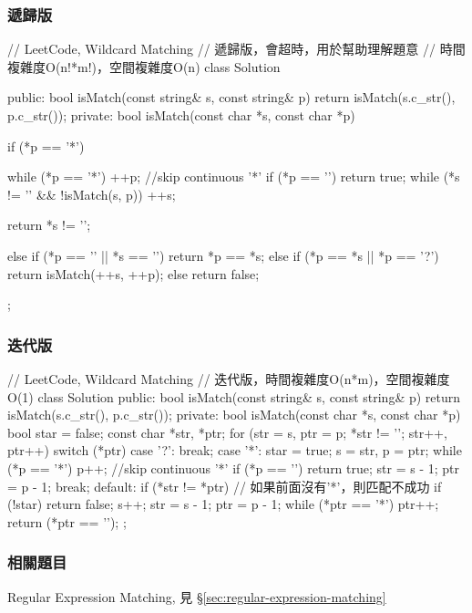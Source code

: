\subsubsection{遞歸版}
\begin{Code}
// LeetCode, Wildcard Matching
// 遞歸版，會超時，用於幫助理解題意
// 時間複雜度O(n!*m!)，空間複雜度O(n)
class Solution {
public:
    bool isMatch(const string& s, const string& p) {
        return isMatch(s.c_str(), p.c_str());
    }
private:
    bool isMatch(const char *s, const char *p) {
        if (*p == '*') {
            while (*p == '*') ++p;  //skip continuous '*'
            if (*p == '\0') return true;
            while (*s != '\0' && !isMatch(s, p)) ++s;

            return *s != '\0';
        }
        else if (*p == '\0' || *s == '\0') return *p == *s;
        else if (*p == *s || *p == '?') return isMatch(++s, ++p);
        else return false;
    }
};
\end{Code}


\subsubsection{迭代版}
\begin{Code}
// LeetCode, Wildcard Matching
// 迭代版，時間複雜度O(n*m)，空間複雜度O(1)
class Solution {
public:
    bool isMatch(const string& s, const string& p) {
        return isMatch(s.c_str(), p.c_str());
    }
private:
    bool isMatch(const char *s, const char *p) {
        bool star = false;
        const char *str, *ptr;
        for (str = s, ptr = p; *str != '\0'; str++, ptr++) {
            switch (*ptr) {
            case '?':
                break;
            case '*':
                star = true;
                s = str, p = ptr;
                while (*p == '*') p++;  //skip continuous '*'
                if (*p == '\0') return true;
                str = s - 1;
                ptr = p - 1;
                break;
            default:
                if (*str != *ptr) {
                    // 如果前面沒有'*'，則匹配不成功
                    if (!star) return false;
                    s++;
                    str = s - 1;
                    ptr = p - 1;
                }
            }
        }
        while (*ptr == '*') ptr++;
        return (*ptr == '\0');
    }
};
\end{Code}


\subsubsection{相關題目}
\begindot
\item Regular Expression Matching, 見 \S \ref{sec:regular-expression-matching}
\myenddot


